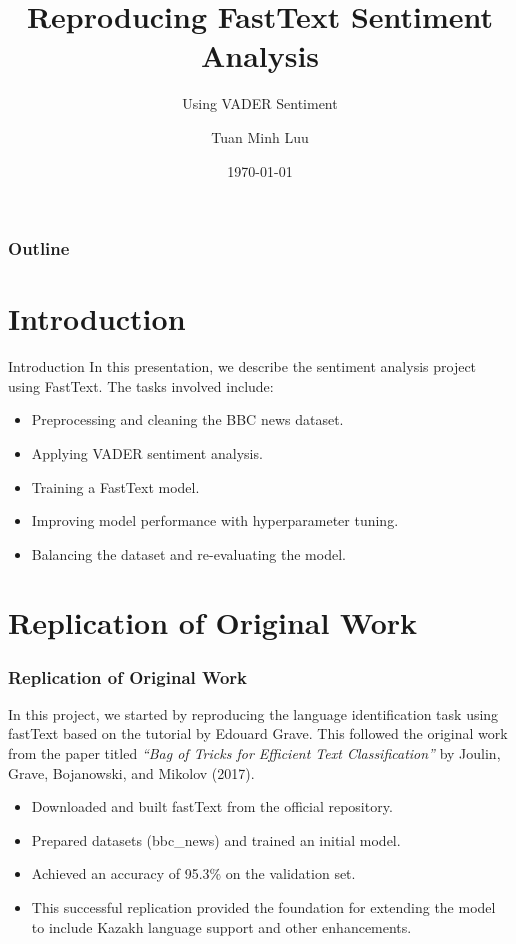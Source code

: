 \documentclass{beamer}
\title{Reproducing FastText Sentiment Analysis}
\subtitle{Using VADER Sentiment }
\author{Tuan Minh Luu}
\institute{Macquarie University}
\date{\today}
\begin{document}
\begin{frame}
    \titlepage
\end{frame}

\begin{frame}
    \frametitle{Outline}
    \tableofcontents
\end{frame}

\section{Introduction}
\begin{frame}{Introduction}
    In this presentation, we describe the sentiment analysis project using FastText. The tasks involved include:
    \begin{itemize}
                \item Preprocessing and cleaning the BBC news dataset.
    \item Applying VADER sentiment analysis.
    \item Training a FastText model.
    \item Improving model performance with hyperparameter tuning.
    \item Balancing the dataset and re-evaluating the model.
    \end{itemize}
    
\end{frame}

\section{Replication of Original Work}
\begin{frame}
    \frametitle{Replication of Original Work}
    In this project, we started by reproducing the language identification task using fastText based on the tutorial by Edouard Grave. This followed the original work from the paper titled \textit{“Bag of Tricks for Efficient Text Classification”} by Joulin, Grave, Bojanowski, and Mikolov (2017).

    \begin{itemize}
        \item Downloaded and built fastText from the official repository.
        \item Prepared datasets (bbc_news) and trained an initial model.
        \item Achieved an accuracy of 95.3\% on the validation set.
        \item This successful replication provided the foundation for extending the model to include Kazakh language support and other enhancements.
    \end{itemize}
\end{frame}
\end{document}
